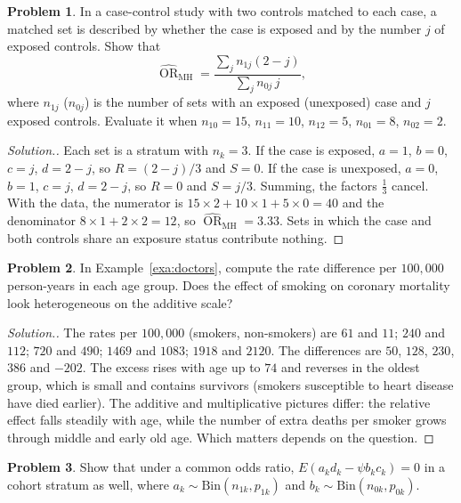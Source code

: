 \documentclass[11pt,a4paper]{article}
\numberwithin{equation}{section}
\DeclareMathOperator{\OR}{OR}
\theoremstyle{definition}
\newtheorem{problemx}{Problem}[subsection]
\newenvironment{problem}{\begin{problemx}}{\end{problemx}}
\newenvironment{solution}
  {\renewcommand{\qedsymbol}{}\begin{proof}[\textit{Solution}.]}
  {\end{proof}}
\begin{document}
\begin{problem}
\label{prob:onetwo}
In a case-control study with two controls matched to each case, a matched set is described by whether the case is exposed and by the
number $j$ of exposed controls. Show that
\[
\widehat{\OR}_{\text{MH}} = \frac{\sum_j n_{1j}(2 - j)}{\sum_j n_{0j}\,j} ,
\]
where $n_{1j}$ ($n_{0j}$) is the number of sets with an exposed (unexposed) case and $j$ exposed controls. Evaluate it when $n_{10} = 15$, $n_{11} = 10$, $n_{12} = 5$,
$n_{01} = 8$, $n_{02} = 2$.
\end{problem}

\begin{solution}
Each set is a stratum with $n_k = 3$. If the case is exposed, $a = 1$, $b = 0$, $c = j$, $d = 2 - j$, so $R = (2 - j)/3$ and $S = 0$. If the case is unexposed, $a = 0$,
$b = 1$, $c = j$, $d = 2 - j$, so $R = 0$ and $S = j/3$. Summing, the factors $\tfrac13$ cancel. With the data, the numerator is $15 \times 2 + 10 \times 1 + 5 \times 0 = 40$ and the
denominator $8 \times 1 + 2 \times 2 = 12$, so $\widehat{\OR}_{\text{MH}} = 3.33$. Sets in which the case and both controls share an exposure status contribute nothing.
\end{solution}

\begin{problem}
\label{prob:doctors}
In Example~\ref{exa:doctors}, compute the rate difference per $100{,}000$ person-years in each age group. Does the effect of smoking on
coronary mortality look heterogeneous on the additive scale?
\end{problem}

\begin{solution}
The rates per $100{,}000$ (smokers, non-smokers) are $61$ and $11$; $240$ and $112$; $720$ and $490$; $1469$ and $1083$; $1918$ and $2120$. The differences are $50$, $128$,
$230$, $386$ and $-202$. The excess rises with age up to $74$ and reverses in the oldest group, which is small and contains survivors (smokers
susceptible to heart disease have died earlier). The additive and multiplicative pictures differ: the relative effect falls steadily
with age, while the number of extra deaths per smoker grows through middle and early old age. Which matters depends on the question.
\end{solution}

\begin{problem}
Show that under a common odds ratio, $E(a_k d_k - \psi b_k c_k) = 0$ in a cohort stratum as well, where $a_k \sim \text{Bin}(n_{1k}, p_{1k})$ and $b_k \sim \text{Bin}(n_{0k}, p_{0k})$.
\end{problem}
\end{document}
